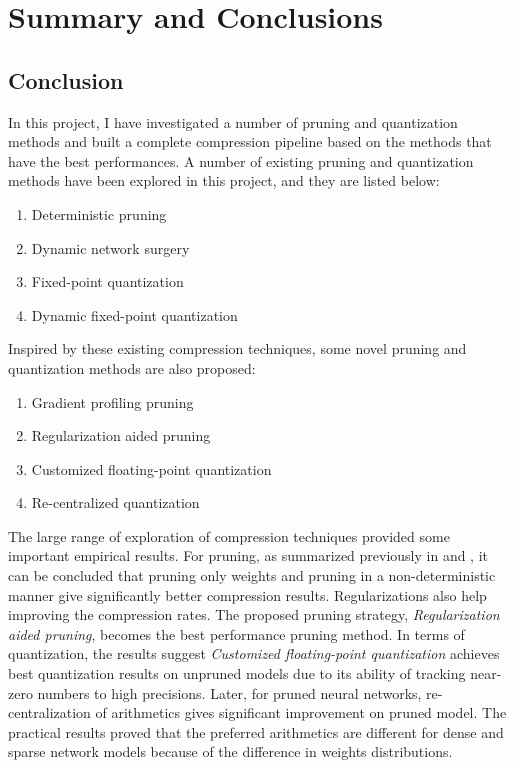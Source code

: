 \documentclass[a4paper,12pt]{report}
\begin{document}
\chapter{Summary and Conclusions}
\section{Conclusion}
In this project, I have investigated a number of pruning and quantization methods
and built a complete compression pipeline based on the methods that have
the best performances.
A number of existing pruning and quantization methods have been explored in this project,
and they are listed below:
\begin{enumerate}
  \item Deterministic pruning
  \item Dynamic network surgery
  \item Fixed-point quantization
  \item Dynamic fixed-point quantization
\end{enumerate}
Inspired by these existing compression techniques,
some novel pruning and quantization methods are also proposed:
\begin{enumerate}
  \item Gradient profiling pruning
  \item Regularization aided pruning
  \item Customized floating-point quantization
  \item Re-centralized quantization
\end{enumerate}

The large range of exploration of compression techniques provided some important
empirical results.
For pruning, as summarized previously in  and ,
it can be concluded that pruning only weights and pruning in a non-deterministic
manner give significantly better compression results.
Regularizations also help improving the compression rates.
The proposed pruning strategy, \textit{Regularization aided pruning}, becomes
the best performance pruning method.
In terms of quantization, the results suggest \textit{Customized floating-point
quantization} achieves best quantization results on unpruned models due to its
ability of tracking near-zero numbers to high precisions.
Later, for pruned neural networks, re-centralization of arithmetics gives significant improvement on
pruned model.
The practical results proved that the preferred arithmetics are different for dense and
sparse network models because of the difference in weights distributions.
\end{document}
